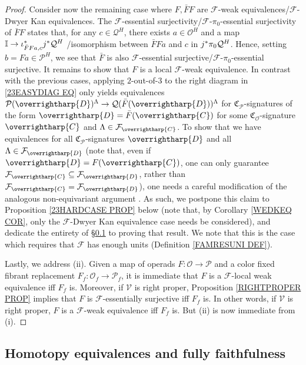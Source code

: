 \documentclass[a4paper,10pt
,draft
]{article}%
\numberwithin{equation}{section}
\numberwithin{figure}{section}
\theoremstyle{definition} %
\newcommand{\vect}[1]{\text{\overrightharp{\ensuremath{#1}}}}
\newcommand{\F}{\ensuremath{\mathcal F}}
\newcommand{\V}{\ensuremath{\mathcal V}}
\renewcommand{\O}{\ensuremath{\mathcal O}}
\renewcommand{\P}{\ensuremath{\mathcal P}}
\newcommand{\1}{\ensuremath{\mathbbm 1}}%
\begin{document}
\begin{proof}
Consider now the remaining case where
$F,\bar{F}F$ are
$\F$-weak equivalences/$\F$-Dwyer Kan equivalences.
The $\F$-essential surjectivity/$\F$-$\pi_0$-essential surjectivity
of $\bar{F}F$
states that, for any $c \in \mathcal{Q}^H$,
there exists $a \in \mathcal{O}^H$ and a map
$\mathbb{I} \to \iota^{\**}_{\bar{F}Fa,c} j^{\**}\mathcal{Q}^H$
/isomorphism between $\bar{F}Fa$ and 
$c$ in $j^{\**}\pi_0\mathcal{Q}^H$.
Hence, setting $b = Fa \in \mathcal{P}^H$,
we see that $\bar{F}$ is also
$\F$-essential surjective/$\F$-$\pi_0$-essential surjective.
It remains to show that
$F$ is a local $\F$-weak equivalence.
In contrast with the previous cases,
applying $2$-out-of-$3$ to the right diagram in \eqref{23EASYDIAG EQ}
only yields equivalences 
$\P(\vect{D})^{\Lambda} \to \mathcal{Q}(\bar{F}(\vect{D}))^{\Lambda}$
for $\mathfrak{C}_{\P}$-signatures of the form
$\vect{D} = \bar{F} (\vect{C})$ for some $\mathfrak{C}_{\O}$-signature $\vect{C}$ 
and $\Lambda \in \F_{\vect{C}}$.
To show that we have equivalences for all
$\mathfrak{C}_{\P}$-signatures $\vect{D}$
and all $\Lambda \in \F_{\vect{D}}$
(note that, even if $\vect{D} = F(\vect{C})$,
one can only guarantee $\F_{\vect{C}} \subseteq \F_{\vect{D}}$,
rather than $\F_{\vect{C}} = \F_{\vect{D}}$),
one needs a careful modification of the analogous non-equivariant argument \cite[Lemma 4.14]{Cav}.
As such, we postpone this claim to 
Proposition \ref{23HARDCASE PROP} below
(note that, by Corollary \ref{WEDKEQ COR}, 
only the $\F$-Dwyer Kan equivalence case needs be considered),
and dedicate the entirety of \S \ref{HMTYEQ SEC}
to proving that result.
We note that this is the case which requires that $\F$ has enough units (Definition \ref{FAMRESUNI DEF}).


Lastly, we address (ii).
Given a map of operads $F\colon \O \to \P$ and a color fixed fibrant replacement
$F_f \colon \O_f \to \P_f$,
it is immediate that 
$F$ is a $\F$-local weak equivalence iff $F_f$ is.
Moreover, if $\V$ is right proper, Proposition \ref{RIGHTPROPER PROP}
implies that $F$ is $\F$-essentially surjective iff $F_f$ is.
In other words, if $\V$ is right proper,
$F$ is a $\F$-weak equivalence iff $F_f$ is.
But (ii) is now immediate from (i).
\end{proof}






\subsection{Homotopy equivalences and fully faithfulness}
\label{HMTYEQ SEC}
\end{document}
